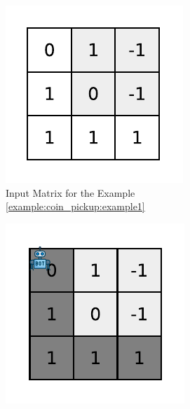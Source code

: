 \begin{QandA}
	\item 
	\begin{answered}
		\textit{}
	\end{answered}
	
\end{QandA}

\begin{figure}
	\centering
	\begin{subfigure}[t]{0.3\textwidth}
		\includegraphics[width=1\linewidth]{sources/coin_pickup/images/example1_0}
		\caption{Input Matrix for the Example \ref{example:coin_pickup:example1}}
		\label{fig:coin_pickup:example_1_0}
	 \end{subfigure}
	\hfill
	\begin{subfigure}[t]{0.3\textwidth}
		\includegraphics[width=1\linewidth]{sources/coin_pickup/images/example1_1}

\end{subfigure}
\end{figure}
